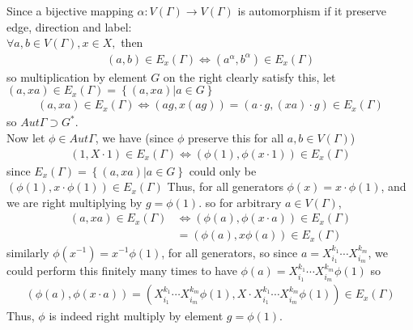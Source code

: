 \documentclass{article}
\begin{document}
\begin{homeworkProblem}
    Since a bijective mapping $\alpha: V(\Gamma) \rightarrow V(\Gamma)$ is automorphism 
    if it preserve edge, direction and label:\\
    $\forall a,b \in V(\Gamma), x \in X,$ then 
    \begin{align}
        (a,b) \in E_x(\Gamma) \Leftrightarrow (a^{\alpha}, b^{\alpha}) \in E_x (\Gamma)
    \end{align}
    so multiplication by element $G$ on the right clearly satisfy this,
    let $(a, xa) \in E_x(\Gamma) = \left\{ (a, xa) | a \in G \right\}$
    \begin{align}
        (a, xa) \in E_x(\Gamma) \Leftrightarrow (ag, x(ag)) = (a \cdot g, (xa) \cdot g) \in E_x(\Gamma)
    \end{align}
    so $Aut \Gamma \supset G^{*}$.\\
    Now let $\phi \in Aut \Gamma$, we have (since $\phi$ preserve this for all $a,b \in V(\Gamma)$)
    \begin{align}
        (1, X \cdot 1) \in E_x (\Gamma) \Leftrightarrow (\phi(1), \phi(x \cdot 1)) \in E_x(\Gamma)
    \end{align}
    since $E_x(\Gamma) = \left\{ (a, xa) | a \in G\right\} $
    could only be $(\phi(1), x \cdot \phi(1)) \in E_x(\Gamma)$
    Thus, for all generators $\phi(x) = x \cdot \phi(1)$, and we are right multiplying by 
    $g = \phi(1)$. so for arbitrary $a \in V(\Gamma)$,
    \begin{align}
        (a, xa) \in E_x (\Gamma) &\Leftrightarrow (\phi(a), \phi(x \cdot a)) \in E_x (\Gamma)\\
        &= (\phi(a), x \phi(a)) \in E_x (\Gamma)
    \end{align}
    similarly $\phi (x^{-1}) = x^{-1} \phi(1)$, for all generators, 
    so since $a = X_{i_1}^{k_1} \cdots X_{i_m}^{k_m}$,
    we could perform this finitely many times to have 
    $\phi(a) = X_{i_1}^{k_1} \cdots X_{i_m}^{k_m} \phi(1)$ so
    \begin{align}
        (\phi(a), \phi(x \cdot a)) 
        = (X_{i_1}^{k_1} \cdots X_{i_m}^{k_m} \phi(1), X \cdot X_{i_1}^{k_1} \cdots X_{i_m}^{k_m} \phi(1)) 
        \in E_x(\Gamma)
    \end{align}
    Thus, $\phi$ is indeed right multiply by element $g = \phi(1)$.\\

    
    
    
    

    

\end{homeworkProblem}
\end{document}

